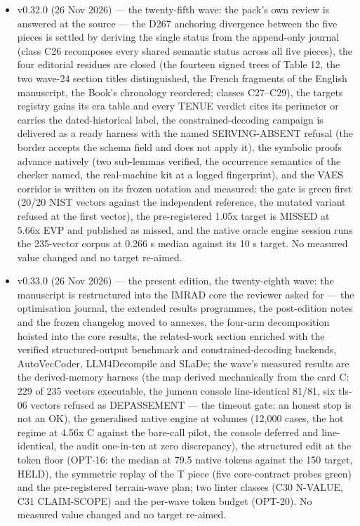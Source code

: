 \documentclass[10pt,a4paper]{article}
\begin{document}
\begin{itemize}
\item v0.32.0 (26 Nov 2026) --- the twenty-fifth wave: the pack's own review is answered at the source --- the D267 anchoring divergence between the five pieces is settled by deriving the single status from the append-only journal (class C26 recomposes every shared semantic status across all five pieces), the four editorial residues are closed (the fourteen signed trees of Table 12, the two wave-24 section titles distinguished, the French fragments of the English manuscript, the Book's chronology reordered; classes C27--C29), the targets registry gains its era table and every TENUE verdict cites its perimeter or carries the dated-historical label, the constrained-decoding campaign is delivered as a ready harness with the named SERVING-ABSENT refusal (the border accepts the schema field and does not apply it), the symbolic proofs advance natively (two sub-lemmas verified, the occurrence semantics of the checker named, the real-machine kit at a logged fingerprint), and the VAES corridor is written on its frozen notation and measured: the gate is green first (20/20 NIST vectors against the independent reference, the mutated variant refused at the first vector), the pre-registered 1.05x target is MISSED at 5.66x EVP and published as missed, and the native oracle engine session runs the 235-vector corpus at 0.266 s median against its 10 s target. No measured value changed and no target re-aimed.\item v0.33.0 (26 Nov 2026) --- the present edition, the twenty-eighth wave: the manuscript is restructured into the IMRAD core the reviewer asked for --- the optimisation journal, the extended results programmes, the post-edition notes and the frozen changelog moved to annexes, the four-arm decomposition hoisted into the core results, the related-work section enriched with the verified structured-output benchmark and constrained-decoding backends, AutoVecCoder, LLM4Decompile and SLaDe; the wave's measured results are the derived-memory harness (the map derived mechanically from the card C: 229 of 235 vectors executable, the jumeau console line-identical 81/81, six tls-06 vectors refused as DEPASSEMENT --- the timeout gate: an honest stop is not an OK), the generalised native engine at volumes (12,000 cases, the hot regime at 4.56x C against the bare-call pilot, the console deferred and line-identical, the audit one-in-ten at zero discrepancy), the structured edit at the token floor (OPT-16: the median at 79.5 native tokens against the 150 target, HELD), the symmetric replay of the T piece (five core-contract probes green) and the pre-registered terrain-wave plan; two linter classes (C30 N-VALUE, C31 CLAIM-SCOPE) and the per-wave token budget (OPT-20). No measured value changed and no target re-aimed.\end{itemize}


\end{document}
